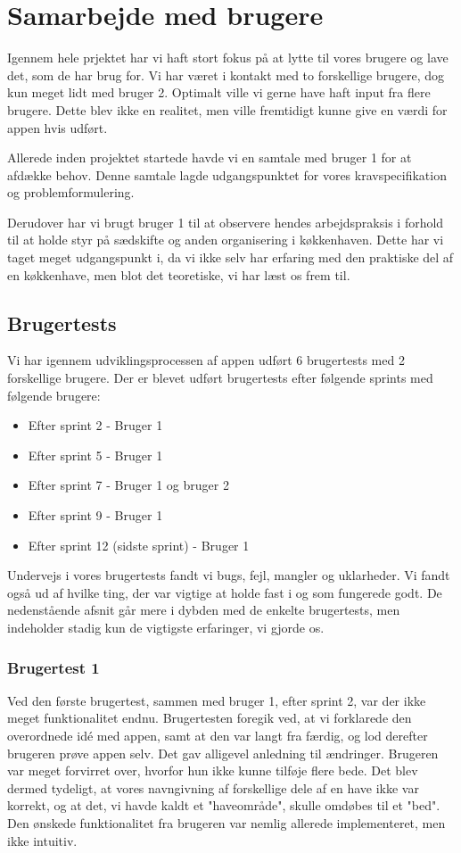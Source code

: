\section{Samarbejde med brugere}
Igennem hele prjektet har vi haft stort fokus på at lytte til vores brugere og lave det, som de har brug for. Vi har været i kontakt med to forskellige brugere, dog kun meget lidt med bruger 2. Optimalt ville vi gerne have haft input fra flere brugere. Dette blev ikke en realitet, men ville fremtidigt kunne give en værdi for appen hvis udført.

Allerede inden projektet startede havde vi en samtale med bruger 1 for at afdække behov. Denne samtale lagde udgangspunktet for vores kravspecifikation og problemformulering.

Derudover har vi brugt bruger 1 til at observere hendes arbejdspraksis i forhold til at holde styr på sædskifte og anden organisering i køkkenhaven. Dette har vi taget meget udgangspunkt i, da vi ikke selv har erfaring med den praktiske del af en køkkenhave, men blot det teoretiske, vi har læst os frem til.

\subsection{Brugertests}
Vi har igennem udviklingsprocessen af appen udført 6 brugertests med 2 forskellige brugere. Der er blevet udført brugertests efter følgende sprints med følgende brugere:
\begin{itemize}
    \item Efter sprint 2 - Bruger 1
    \item Efter sprint 5 - Bruger 1
    \item Efter sprint 7 - Bruger 1 og bruger 2
    \item Efter sprint 9 - Bruger 1
    \item Efter sprint 12 (sidste sprint) - Bruger 1
\end{itemize}

Undervejs i vores brugertests fandt vi bugs, fejl, mangler og uklarheder. Vi fandt også ud af hvilke ting, der var vigtige at holde fast i og som fungerede godt. De nedenstående afsnit går mere i dybden med de enkelte brugertests, men indeholder stadig kun de vigtigste erfaringer, vi gjorde os.

\subsubsection{Brugertest 1}
Ved den første brugertest, sammen med bruger 1, efter sprint 2, var der ikke meget funktionalitet endnu. Brugertesten foregik ved, at vi forklarede den overordnede idé med appen, samt at den var langt fra færdig, og lod derefter brugeren prøve appen selv. Det gav alligevel anledning til ændringer. Brugeren var meget forvirret over, hvorfor hun ikke kunne tilføje flere bede. Det blev dermed tydeligt, at vores navngivning af forskellige dele af en have ikke var korrekt, og at det, vi havde kaldt et "haveområde", skulle omdøbes til et "bed". Den ønskede funktionalitet fra brugeren var nemlig allerede implementeret, men ikke intuitiv.

